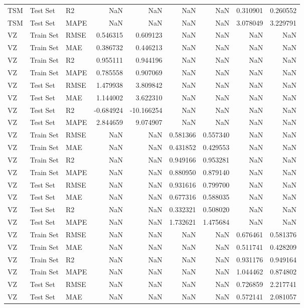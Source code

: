\begin{tabular}{lllrrrrrr}
TSM & Test Set & R2 & NaN & NaN & NaN & NaN & 0.310901 & 0.260552 \\
TSM & Test Set & MAPE & NaN & NaN & NaN & NaN & 3.078049 & 3.229791 \\
VZ & Train Set & RMSE & 0.546315 & 0.609123 & NaN & NaN & NaN & NaN \\
VZ & Train Set & MAE & 0.386732 & 0.446213 & NaN & NaN & NaN & NaN \\
VZ & Train Set & R2 & 0.955111 & 0.944196 & NaN & NaN & NaN & NaN \\
VZ & Train Set & MAPE & 0.785558 & 0.907069 & NaN & NaN & NaN & NaN \\
VZ & Test Set & RMSE & 1.479938 & 3.809842 & NaN & NaN & NaN & NaN \\
VZ & Test Set & MAE & 1.144002 & 3.622310 & NaN & NaN & NaN & NaN \\
VZ & Test Set & R2 & -0.684924 & -10.166254 & NaN & NaN & NaN & NaN \\
VZ & Test Set & MAPE & 2.844659 & 9.074907 & NaN & NaN & NaN & NaN \\
VZ & Train Set & RMSE & NaN & NaN & 0.581366 & 0.557340 & NaN & NaN \\
VZ & Train Set & MAE & NaN & NaN & 0.431852 & 0.429553 & NaN & NaN \\
VZ & Train Set & R2 & NaN & NaN & 0.949166 & 0.953281 & NaN & NaN \\
VZ & Train Set & MAPE & NaN & NaN & 0.880950 & 0.879140 & NaN & NaN \\
VZ & Test Set & RMSE & NaN & NaN & 0.931616 & 0.799700 & NaN & NaN \\
VZ & Test Set & MAE & NaN & NaN & 0.677316 & 0.588035 & NaN & NaN \\
VZ & Test Set & R2 & NaN & NaN & 0.332321 & 0.508020 & NaN & NaN \\
VZ & Test Set & MAPE & NaN & NaN & 1.732621 & 1.475684 & NaN & NaN \\
VZ & Train Set & RMSE & NaN & NaN & NaN & NaN & 0.676461 & 0.581376 \\
VZ & Train Set & MAE & NaN & NaN & NaN & NaN & 0.511741 & 0.428209 \\
VZ & Train Set & R2 & NaN & NaN & NaN & NaN & 0.931176 & 0.949164 \\
VZ & Train Set & MAPE & NaN & NaN & NaN & NaN & 1.044462 & 0.874802 \\
VZ & Test Set & RMSE & NaN & NaN & NaN & NaN & 0.726859 & 2.217741 \\
VZ & Test Set & MAE & NaN & NaN & NaN & NaN & 0.572141 & 2.081057 \\

\end{tabular}

